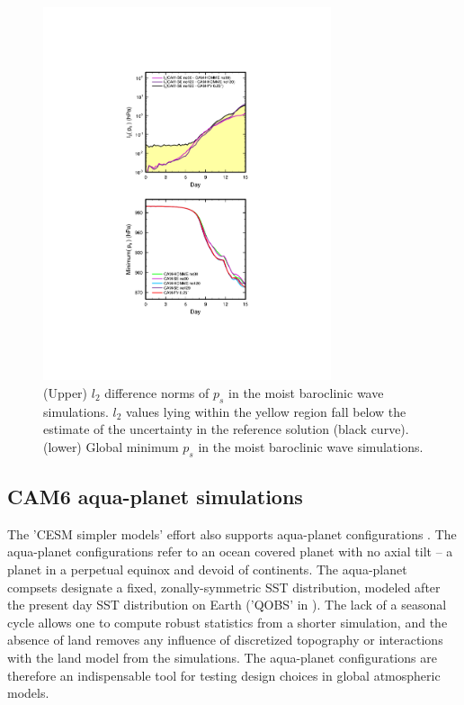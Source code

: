 \documentclass{agujournal}
\begin{document}
\begin{figure}[h]
\centering
\includegraphics[width=20pc]{figs/l2.pdf}
\caption{(Upper) $l_2$ difference norms of $p_s$ in the moist baroclinic wave simulations. $l_2$ values lying within the yellow region fall below the estimate of the uncertainty in the reference solution (black curve). (lower) Global minimum $p_s$ in the moist baroclinic wave simulations.}
\label{fig:l2norm}
\end{figure}

\subsection{CAM6 aqua-planet simulations}\label{sec:APE}
The 'CESM simpler models' effort also supports aqua-planet configurations \citep{MWO2016JAMES}. The aqua-planet configurations \citep{NH2000ASL} refer to an ocean covered planet with no axial tilt -- a planet in a perpetual equinox and devoid of continents. The aqua-planet compsets designate a fixed, zonally-symmetric SST distribution, modeled after the present day SST distribution on Earth ('QOBS' in \cite{NH2000ASL}). The lack of a seasonal cycle allows one to compute robust statistics from a shorter simulation, and the absence of land removes any influence of discretized topography or interactions with the land model from the simulations. The aqua-planet configurations are therefore an indispensable tool for testing design choices in global atmospheric models.
\end{document}
